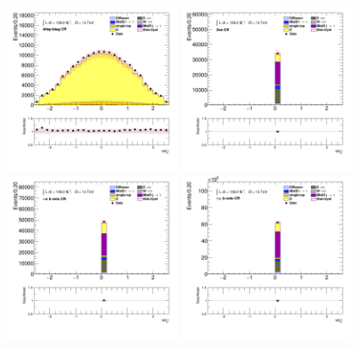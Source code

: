 		\begin{figure}[!htp]
			\begin{center}    
			\includegraphics[width=0.45\textwidth]{chapters/chapter6_HPlus/images/taulep/bjet_0_eta_DILEP_BTAG.png}
			\includegraphics[width=0.45\textwidth]{chapters/chapter6_HPlus/images/taulep/bjet_0_eta_ZEE.png} \\
			\includegraphics[width=0.45\textwidth]{chapters/chapter6_HPlus/images/taulep/bjet_0_eta_TAUEL_BVETO.png} 
			\includegraphics[width=0.45\textwidth]{chapters/chapter6_HPlus/images/taulep/bjet_0_eta_TAUMU_BVETO.png} \\

\end{center}
\end{figure}
